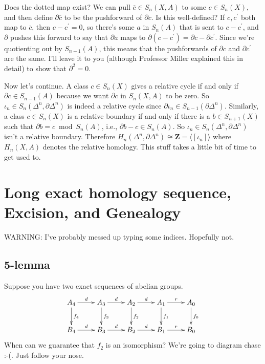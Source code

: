 Does the dotted map exist? We can pull $\overline{c}\in S_n(X,A)$ to some $c\in S_n(X)$, and then define $\partial\overline{c}$ to be the pushforward of $\partial c$. Is this well-defined? If $c,c^\prime$ both map to $\overline{c}$, then $c-c^\prime=0$, so there's some $a$ in $S_n(A)$ that is sent to $c-c^\prime$, and $\partial$ pushes this forward to say that $\partial a$ maps to $\partial(c-c^\prime)=\partial c-\partial c^\prime$. Since we're quotienting out by $S_{n-1}(A)$, this means that the pushforwards of $\partial c$ and $\partial c^\prime$ are the same. I'll leave it to you (although Professor Miller explained this in detail) to show that $\partial^2=0$. 

Now let's continue. A class $c\in S_n(X)$ gives a relative cycle if and only if $\partial c\in S_{n-1}(A)$ because we want $\partial c$ in $S_n(X,A)$ to be zero. So $\iota_n\in S_n(\Delta^n,\partial\Delta^n)$ is indeed a relative cycle since $\partial\iota_n\in S_{n-1}(\partial\Delta^n)$. Similarly, a class $c\in S_n(X)$ is a relative boundary if and only if there is a $b\in S_{n+1}(X)$ such that $\partial b=c\bmod S_n(A)$, i.e., $\partial b-c\in S_n(A)$. So $\iota_n\in S_n(\Delta^n,\partial\Delta^n)$ isn't a relative boundary. Therefore $ H_n(\Delta^n,\partial\Delta^n)\cong\mathbf{Z}=\langle[\iota_n]\rangle$ where $ H_n(X,A)$ denotes the relative homology. This stuff takes a little bit of time to get used to.
\section{Long exact homology sequence, Excision, and Genealogy}
WARNING: I've probably messed up typing some indices. Hopefully not.
\subsection{5-lemma}
Suppose you have two exact sequences of abelian groups.
\begin{equation*}
\xymatrix{A_4\ar[r]^d\ar[d]^{f_4} & A_3\ar[r]^d\ar[d]^{f_3} & A_2\ar[r]^d\ar[d]^{f_2} & A_1\ar[r]^r\ar[d]^{f_1} & A_0\ar[d]^{f_0}\\
B_4\ar[r]^d & B_3\ar[r]^d & B_2\ar[r]^d & B_1\ar[r]^r & B_0}
\end{equation*}
When can we guarantee that $f_2$ is an isomorphism? We're going to diagram chase :-(. Just follow your nose.

